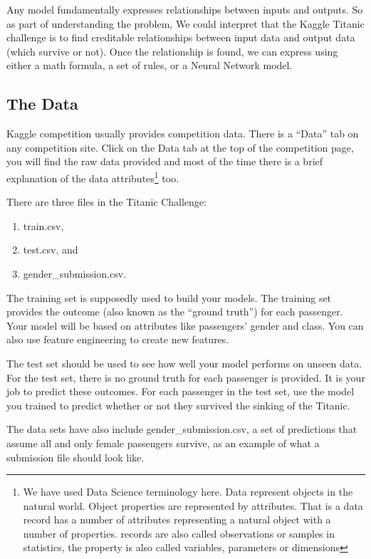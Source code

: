 \documentclass[
]{book}
\providecommand{\tightlist}{%
  \setlength{\itemsep}{0pt}\setlength{\parskip}{0pt}}
\begin{document}
Any model fundamentally expresses relationships between inputs and outputs. So as part of understanding the problem, We could interpret that the Kaggle Titanic challenge is to find creditable relationships between input data and output data (which survive or not). Once the relationship is found, we can express using either a math formula, a set of rules, or a Neural Network model.

\hypertarget{the-data}{%
\subsection*{The Data}\label{the-data}}


Kaggle competition usually provides competition data. There is a ``Data'' tab on any competition site. Click on the Data tab at the top of the competition page, you will find the raw data provided and most of the time there is a brief explanation of the data attributes\footnote{We have used Data Science terminology here. Data represent objects in the natural world. Object properties are represented by attributes. That is a data record has a number of attributes representing a natural object with a number of properties. records are also called observations or samples in statistics, the property is also called variables, parameters or dimensions} too.

There are three files in the Titanic Challenge:

\begin{enumerate}
\def\labelenumi{(\arabic{enumi})}
\tightlist
\item
  train.csv,
\item
  test.csv, and
\item
  gender\_submission.csv.
\end{enumerate}

The training set is supposedly used to build your models. The training set provides the outcome (also known as the ``ground truth'') for each passenger. Your model will be based on attributes like passengers' gender and class. You can also use feature engineering to create new features.

The test set should be used to see how well your model performs on unseen data. For the test set, there is no ground truth for each passenger is provided. It is your job to predict these outcomes. For each passenger in the test set, use the model you trained to predict whether or not they survived the sinking of the Titanic.

The data sets have also include gender\_submission.csv, a set of predictions that assume all and only female passengers survive, as an example of what a submission file should look like.
\end{document}
